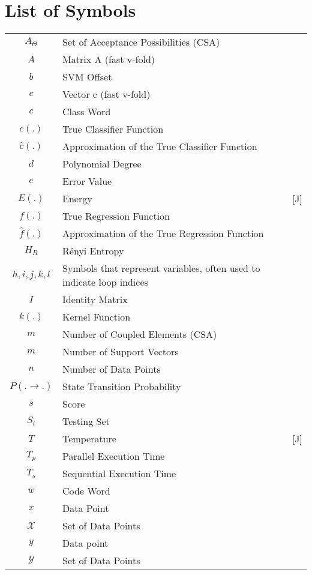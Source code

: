 \chapter*{List of Symbols}


\begin{longtable}{cll}
	$A_\Theta$& Set of Acceptance Possibilities (CSA)&\\
	$A$& Matrix A (fast v-fold)&\\
	$b$ & SVM Offset& \\
	$c$ & Vector c (fast v-fold)&\\
	$c$ & Class Word & \\
	$c(.)$ & True Classifier Function & \\
	$\hat{c}(.)$ & Approximation of the True Classifier Function & \\
	$d$ & Polynomial Degree& \\
	$e$& Error Value&\\
	$E(.)$& Energy & [J]\\
	$f(.)$ & True Regression Function & \\
	$\hat{f}(.)$ & Approximation of the True Regression Function & \\
	$H_R$&R\'enyi Entropy&\\
	$h,i,j,k,l$ & Symbols that represent variables, often used to indicate loop indices & \\ 
	$I$ & Identity Matrix&\\
	$k(.)$& Kernel Function&\\
	$m$ & Number of Coupled Elements (CSA)&\\
	$m$ & Number of Support Vectors&\\
	$n$ & Number of Data Points&\\
	$P(. \rightarrow .)$& State Transition Probability &\\
	$s$ & Score & \\
	$S_i$ & Testing Set& \\
	$T$& Temperature&[J] \\
	$T_p$& Parallel Execution Time &\\
	$T_s$& Sequential Execution Time &\\
	$w$ & Code Word & \\
	$x$ & Data Point & \\
	$\mathscr{X}$ & Set of Data Points & \\
	$y$ & Data point & \\
	$\mathscr{Y}$ & Set of Data Points & \\

\end{longtable}
